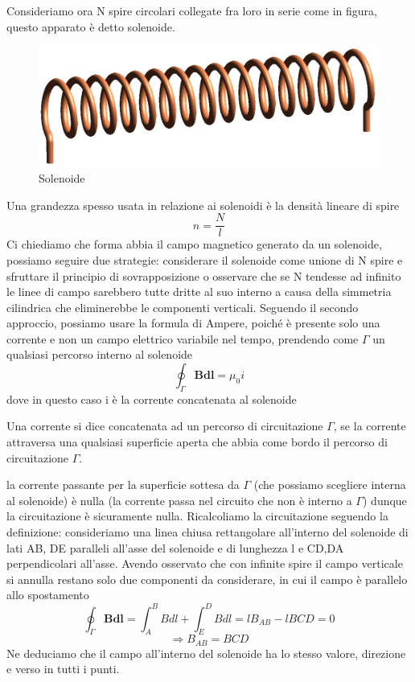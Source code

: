 \documentclass[
10pt, %
a4paper, %
oneside, %
headinclude,footinclude, %
BCOR5mm, %
]{scrartcl}
\begin{document}
Consideriamo ora N spire circolari collegate fra loro in serie come in figura, questo apparato è detto solenoide.
\begin{figure}[h!]
	\centering
	\includegraphics[width=0.6\linewidth]{images/Solenoid}
	\caption{Solenoide}
	\label{fig:solenoide}
\end{figure}
\FloatBarrier
Una grandezza spesso usata in relazione ai solenoidi è la densità lineare di spire 
\[n = \frac{N}{l}\]
Ci chiediamo che forma abbia il campo magnetico generato da un solenoide, possiamo seguire due strategie: considerare il solenoide come unione di N spire e sfruttare il principio di sovrapposizione o osservare che se N tendesse ad infinito le linee di campo sarebbero tutte dritte al suo interno a causa della simmetria cilindrica che eliminerebbe le componenti verticali. Seguendo il secondo approccio, possiamo usare la formula di Ampere, poiché è presente solo una corrente e non un campo elettrico variabile nel tempo, prendendo come $\Gamma$ un qualsiasi percorso interno al solenoide
\[\oint_{\Gamma}\mathbf{B}\mathbf{dl}= \mu_0 i\]
dove in questo caso i è la corrente concatenata al solenoide
\begin{definizione}
	Una corrente si dice concatenata ad un percorso di circuitazione \(\Gamma\), se la corrente attraversa una qualsiasi superficie aperta che abbia come bordo il percorso di circuitazione \(\Gamma\). 
\end{definizione}
la corrente passante per la superficie sottesa da $\Gamma$ (che possiamo scegliere interna al solenoide) è nulla (la corrente passa nel circuito che non è interno a $\Gamma$) dunque la circuitazione è sicuramente nulla. 
Ricalcoliamo la circuitazione seguendo la definizione: consideriamo una linea chiusa rettangolare all'interno del solenoide di lati AB, DE paralleli all'asse del solenoide e di lunghezza l e CD,DA perpendicolari all'asse. Avendo osservato che con infinite spire il campo verticale si annulla restano solo due componenti da considerare, in cui il campo è parallelo allo spostamento
\[\oint_{\Gamma}\mathbf{B}\mathbf{dl}= \int_{A}^{B}Bdl+\int_{E}^{D}Bdl=lB_{AB}-lB{CD}=0\]
\[\Rightarrow B_{AB}=B{CD}\]
Ne deduciamo che il campo all'interno del solenoide ha lo stesso valore, direzione e verso in tutti i punti.\\
\end{document}
